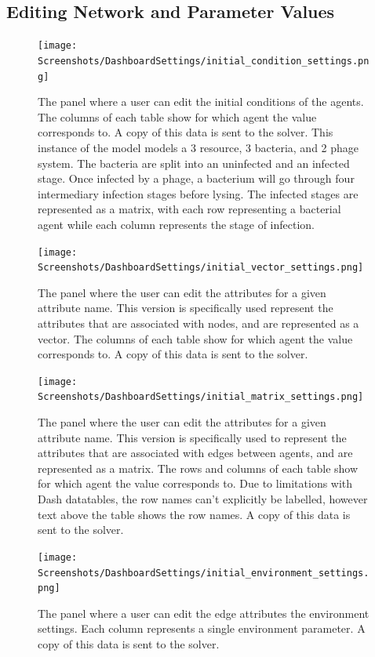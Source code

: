 \subsection{Editing Network and Parameter Values}
\begin{figure}
    \centering
    \texttt{[image: Screenshots/DashboardSettings/initial\_condition\_settings.png]}
    \caption{
        The panel where a user can edit the initial conditions of the agents. 
        The columns of each table show for which agent the value corresponds to. 
        A copy of this data is sent to the solver. 
        This instance of the model models a 3 resource, 3 bacteria, and 2 phage system. 
        The bacteria are split into an uninfected and an infected stage. 
        Once infected by a phage, a bacterium will go through four intermediary infection stages before lysing. 
        The infected stages are represented as a matrix, with each row representing a bacterial agent while each column represents the stage of infection. 
    }
    \label{fig:ss:ds:initial_condition}
\end{figure}
\begin{figure}
    \centering
    \texttt{[image: Screenshots/DashboardSettings/initial\_vector\_settings.png]}
    \caption{
        The panel where the user can edit the attributes for a given attribute name. 
        This version is specifically used represent the attributes that are associated with nodes, and are represented as a vector. 
        The columns of each table show for which agent the value corresponds to. 
        A copy of this data is sent to the solver.
    }
    \label{fig:ss:ds:vector}
\end{figure}
\begin{figure}
    \centering
    \texttt{[image: Screenshots/DashboardSettings/initial\_matrix\_settings.png]}
    \caption{
        The panel where the user can edit the attributes for a given attribute name. 
        This version is specifically used to represent the attributes that are associated with edges between agents, and are represented as a matrix. 
        The rows and columns of each table show for which agent the value corresponds to. 
        Due to limitations with Dash datatables, the row names can't explicitly be labelled, however text above the table shows the row names. 
        A copy of this data is sent to the solver. 
    }
    \label{fig:ss:ds:matrix}
\end{figure}
\begin{figure}
    \centering
    \texttt{[image: Screenshots/DashboardSettings/initial\_environment\_settings.png]}
    \caption{
        The panel where a user can edit the edge attributes the environment settings. 
        Each column represents a single environment parameter. 
        A copy of this data is sent to the solver.
    }
    \label{fig:ss:ds:environment}
\end{figure}
